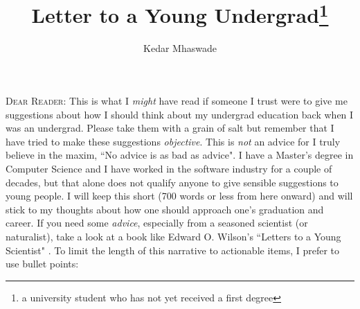 \documentclass[12pt]{article}
\begin{document}
\title{Letter to a Young Undergrad\footnote{a university student who has not yet received a first degree}}
\author{Kedar Mhaswade}
\maketitle
\lettrine[lines=3]{D}{ear Reader}: This is what I \emph{might} have read if someone I trust were to give me suggestions about how I should think about my undergrad education back when I was an undergrad. Please take them with a grain of salt but remember that I have tried to make these suggestions \emph{objective}. This is \emph{not} an advice for I truly believe in the maxim, ``No advice is as bad as advice". I have a Master's degree in Computer Science and I have worked in the software industry for a couple of decades, but that alone does not qualify anyone to give sensible suggestions to young people. I will keep this short (700 words or less from here onward) and will stick to my thoughts about how one should approach one's graduation and career. If you need some \emph{advice}, especially from a seasoned scientist (or naturalist), take a look at a book like Edward O. Wilson's ``Letters to a Young Scientist" \cite{letters}. To limit the length of this narrative to actionable items, I prefer to use bullet points:
\end{document}
